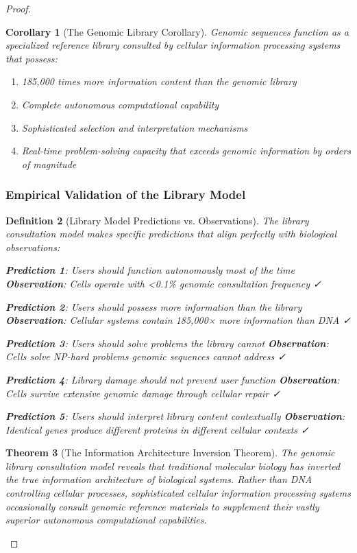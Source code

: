 \documentclass[12pt,a4paper]{article}
\newtheorem{theorem}{Theorem}[section]
\newtheorem{definition}[theorem]{Definition}
\newtheorem{corollary}[theorem]{Corollary}
\begin{document}
\begin{proof}
\begin{corollary}[The Genomic Library Corollary]
Genomic sequences function as a specialized reference library consulted by cellular information processing systems that possess:
\begin{enumerate}
\item 185,000 times more information content than the genomic library
\item Complete autonomous computational capability
\item Sophisticated selection and interpretation mechanisms
\item Real-time problem-solving capacity that exceeds genomic information by orders of magnitude
\end{enumerate}
\end{corollary}

\subsubsection{Empirical Validation of the Library Model}

\begin{definition}[Library Model Predictions vs. Observations]
The library consultation model makes specific predictions that align perfectly with biological observations:

\textbf{Prediction 1}: Users should function autonomously most of the time
\textbf{Observation}: Cells operate with <0.1\% genomic consultation frequency ✓

\textbf{Prediction 2}: Users should possess more information than the library
\textbf{Observation}: Cellular systems contain 185,000× more information than DNA ✓

\textbf{Prediction 3}: Users should solve problems the library cannot
\textbf{Observation}: Cells solve NP-hard problems genomic sequences cannot address ✓

\textbf{Prediction 4}: Library damage should not prevent user function
\textbf{Observation}: Cells survive extensive genomic damage through cellular repair ✓

\textbf{Prediction 5}: Users should interpret library content contextually
\textbf{Observation}: Identical genes produce different proteins in different cellular contexts ✓
\end{definition}

\begin{theorem}[The Information Architecture Inversion Theorem]
The genomic library consultation model reveals that traditional molecular biology has inverted the true information architecture of biological systems. Rather than DNA controlling cellular processes, sophisticated cellular information processing systems occasionally consult genomic reference materials to supplement their vastly superior autonomous computational capabilities.
\end{theorem}


\end{proof}
\end{document}
